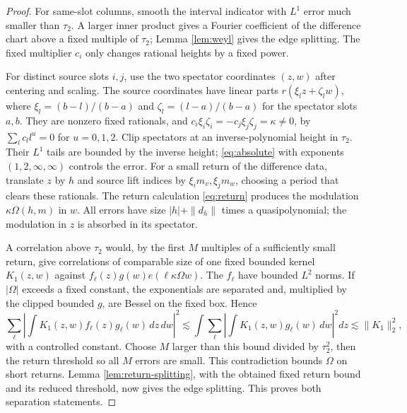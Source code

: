 \documentclass[11pt]{article}
\theoremstyle{definition}
\numberwithin{equation}{section}
\begin{document}
\begin{proof}
For same-slot columns, smooth the interval indicator with $L^1$ error much smaller than $\tau_2$. A larger inner product gives a Fourier coefficient of the difference chart above a fixed multiple of $\tau_2$; Lemma \ref{lem:weyl} gives the edge splitting. The fixed multiplier $c_i$ only changes rational heights by a fixed power.

For distinct source slots $i,j$, use the two spectator coordinates $(z,w)$ after centering and scaling. The source coordinates have linear parts $r(\xi_lz+\zeta_lw)$, where $\xi_l=(b-l)/(b-a)$ and $\zeta_l=(l-a)/(b-a)$ for the spectator slots $a,b$. They are nonzero fixed rationals, and $c_i\xi_i\zeta_i=-c_j\xi_j\zeta_j=\kappa\ne0$, by $\sum_lc_ll^u=0$ for $u=0,1,2$. Clip spectators at an inverse-polynomial height in $\tau_2$. Their $L^1$ tails are bounded by the inverse height; \eqref{eq:absolute} with exponents $(1,2,\infty,\infty)$ controls the error. For a small return of the difference data, translate $z$ by $h$ and source lift indices by $\xi_i m_v,\xi_jm_w$, choosing a period that clears these rationals. The return calculation \eqref{eq:return} produces the modulation $\kappa\Omega(h,m)$ in $w$. All errors have size $|h|+\|d_h\|$ times a quasipolynomial; the modulation in $z$ is absorbed in its spectator.

A correlation above $\tau_2$ would, by the first $M$ multiples of a sufficiently small return, give correlations of comparable size of one fixed bounded kernel $K_1(z,w)$ against $f_\ell(z)g(w)e(\ell\kappa\Omega w)$. The $f_\ell$ have bounded $L^2$ norms. If $|\Omega|$ exceeds a fixed constant, the exponentials are separated and, multiplied by the clipped bounded $g$, are Bessel on the fixed box. Hence
\[
 \sum_\ell\left|\int K_1(z,w)f_\ell(z)g_\ell(w)\,dz\,dw\right|^2
 \lesssim\int\sum_\ell\left|\int K_1(z,w)g_\ell(w)\,dw\right|^2dz
 \lesssim\|K_1\|_2^2,
\]
with a controlled constant. Choose $M$ larger than this bound divided by $\tau_2^2$, then the return threshold so all $M$ errors are small. This contradiction bounds $\Omega$ on short returns. Lemma \ref{lem:return-splitting}, with the obtained fixed return bound and its reduced threshold, now gives the edge splitting. This proves both separation statements.


\end{proof}
\end{document}
